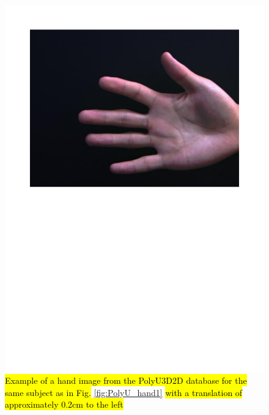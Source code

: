 \documentclass[review]{elsarticle}
\begin{document}
		\begin{figure}[!h]
		    \centering
		    \includegraphics[page=2,scale=.57,trim=1cm 14.7cm 1cm 1.5cm,clip]{PolyU3D2D_samples.pdf}
		    \caption{\hl{Example of a hand image from the PolyU3D2D database for the same subject as in Fig.} \ref{fig:PolyU_hand1} \hl{with a translation of approximately 0.2cm to the left}}
		    \label{fig:PolyU_hand2}
		\end{figure}
\end{document}
